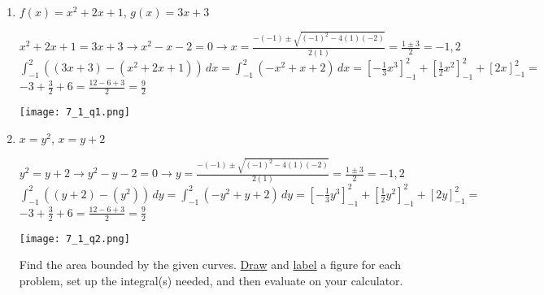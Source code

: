 \documentclass[10pt,letterpaper]{report}
\begin{document}
\begin{enumerate}

  \item{$f(x)=x^{2}+2x+1$, $g(x)=3x+3$ \\}
  
    $x^{2}+2x+1=3x+3\rightarrow x^{2}-x-2=0\rightarrow x=\frac{-(-1)\pm\sqrt{(-1)^{2}-4(1)(-2)}}{2(1)}=\frac{1\pm3}{2}=-1, 2$ \\
    
    $\int_{-1}^{2}{\left(\left(3x+3\right)-\left(x^{2}+2x+1\right)\right)}\,dx=
    \int_{-1}^{2}{\left(-x^{2}+x+2\right)}\,dx=
    [-\frac{1}{3}x^{3}]_{-1}^{2}+[\frac{1}{2}x^{2}]_{-1}^{2}+[2x]_{-1}^{2}=$ \\
    
    $ -3+\frac{3}{2}+6=\frac{12-6+3}{2}=\frac{9}{2}$ \\
    
    \begin{center}
      \texttt{[image: 7\_1\_q1.png]} \\
    \end{center}
    
    \pagebreak
    
  \item{$x=y^{2}$, $x=y+2$ \\}
  
    $y^{2}=y+2\rightarrow y^{2}-y-2=0\rightarrow y=\frac{-(-1)\pm\sqrt{(-1)^{2}-4(1)(-2)}}{2(1)}=\frac{1\pm3}{2}=-1, 2$ \\
    
    $\int_{-1}^{2}{\left(\left(y+2\right)-\left(y^{2}\right)\right)}\,dy=
    \int_{-1}^{2}{\left(-y^{2}+y+2\right)}\,dy=
    [-\frac{1}{3}y^{3}]_{-1}^{2}+[\frac{1}{2}y^{2}]_{-1}^{2}+[2y]_{-1}^{2}=$ \\
    
    $ -3+\frac{3}{2}+6=\frac{12-6+3}{2}=\frac{9}{2}$ \\
    
    \begin{center}
      \texttt{[image: 7\_1\_q2.png]} \\
    \end{center}
    
    \pagebreak
    
  \noindent Find the area bounded by the given curves. \underline{Draw} and \underline{label} a figure for each problem, set up the integral(s) needed, and then evaluate on your calculator. \\
    

\end{enumerate}
\end{document}
